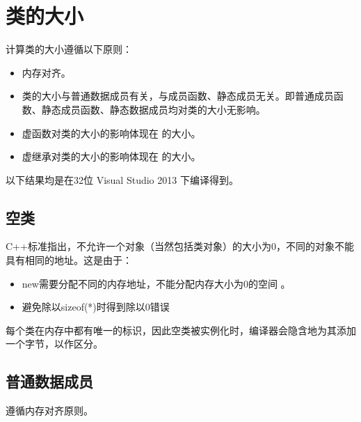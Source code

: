 \documentclass[letterpaper,10pt,english]{sphinxmanual}
\begin{document}
\section{类的大小}
\label{\detokenize{cpp/04_classSize::doc}}\label{\detokenize{cpp/04_classSize:id1}}
计算类的大小遵循以下原则：
\begin{itemize}
\item {} 
内存对齐。

\item {} 
类的大小与普通数据成员有关，与成员函数、静态成员无关。即普通成员函数、静态成员函数、静态数据成员均对类的大小无影响。

\item {} 
虚函数对类的大小的影响体现在  的大小。

\item {} 
虚继承对类的大小的影响体现在  的大小。

\end{itemize}

以下结果均是在32位 Visual Studio 2013 下编译得到。


\subsection{空类}
\label{\detokenize{cpp/04_classSize:id2}}
C++标准指出，不允许一个对象（当然包括类对象）的大小为0，不同的对象不能具有相同的地址。这是由于：
\begin{itemize}
\item {} 
new需要分配不同的内存地址，不能分配内存大小为0的空间 。

\item {} 
避免除以sizeof(*)时得到除以0错误

\end{itemize}

每个类在内存中都有唯一的标识，因此空类被实例化时，编译器会隐含地为其添加一个字节，以作区分。

%
\begin{sphinxVerbatim}[commandchars=\\\{\},numbers=left,firstnumber=1,stepnumber=1]
 
\end{sphinxVerbatim}


\subsection{普通数据成员}
\label{\detokenize{cpp/04_classSize:id3}}
遵循内存对齐原则。
\end{document}
